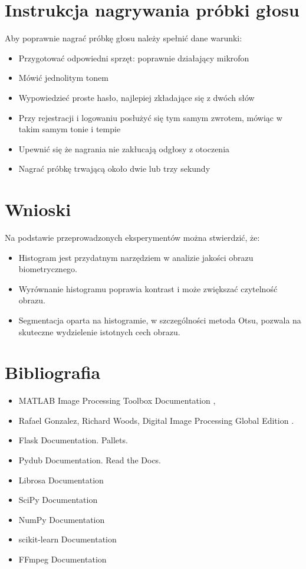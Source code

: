 \section{Instrukcja nagrywania próbki głosu}
Aby poprawnie nagrać próbkę głosu należy spełnić dane warunki:
\begin{itemize}
	\item Przygotować odpowiedni sprzęt: poprawnie działający mikrofon
	\item Mówić jednolitym tonem 
	\item Wypowiedzieć proste hasło, najlepiej zkładające się z dwóch słów
	\item Przy rejestracji i logowaniu posłużyć się tym samym zwrotem, mówiąc w takim samym tonie i tempie
	\item Upewnić się że nagrania nie zakłucają odgłosy z otoczenia
	\item Nagrać próbkę trwającą około dwie lub trzy sekundy
	
\end{itemize}


\section{Wnioski}
Na podstawie przeprowadzonych eksperymentów można stwierdzić, że:
\begin{itemize}
    \item Histogram jest przydatnym narzędziem w analizie jakości obrazu biometrycznego.
    \item Wyrównanie histogramu poprawia kontrast i może zwiększać czytelność obrazu.
    \item Segmentacja oparta na histogramie, w szczególności metoda Otsu, pozwala na skuteczne wydzielenie istotnych cech obrazu.
\end{itemize}

\section{Bibliografia}
\begin{itemize}
    \item MATLAB Image Processing Toolbox Documentation \cite{mathworks},
    \item Rafael Gonzalez, Richard Woods, Digital Image Processing Global Edition \cite{gonzalez2017}.
    \item Flask Documentation. Pallets.  \cite{flask_docs}
    \item Pydub Documentation. Read the Docs.  \cite{pydub_docs}
    \item Librosa Documentation  \cite{librosa_docs}
    \item SciPy Documentation  \cite{scipy_docs}
    \item NumPy Documentation \cite{numpy_docs}
    \item scikit-learn Documentation  \cite{scikitlearn_docs}
    \item FFmpeg Documentation  \cite{ffmpeg_docs}
    
\end{itemize}
